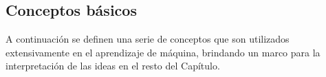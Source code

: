 %
%
\subsection{Conceptos básicos}
%
A continuación se definen una serie de conceptos que son utilizados
extensivamente en el aprendizaje de máquina, brindando un marco para
la interpretación de las ideas en el resto del Capítulo.
